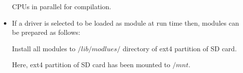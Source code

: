 \begin{itemize}
 CPUs in parallel for compilation.\par
  \par
 \item If a driver is selected to be loaded as module at run time
 then, modules can be prepared as follows:\par
  \par
 Install all modules to $/lib/modlues/$ directory of ext4
 partition of SD card.\par
  \par
 Here, ext4 partition of SD card has been mounted to $/mnt$.
\end{itemize}
